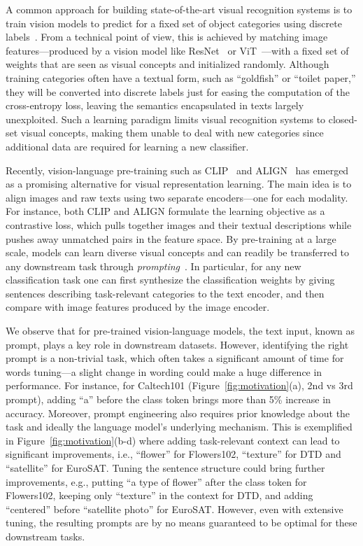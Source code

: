 A common approach for building state-of-the-art visual recognition systems is to train vision models to predict for a fixed set of object categories using discrete labels~\citep{he2016deep,dosovitskiy2021image}. From a technical point of view, this is achieved by matching image features---produced by a vision model like ResNet~\citep{he2016deep} or ViT~\citep{dosovitskiy2021image}---with a fixed set of weights that are seen as visual concepts and initialized randomly. Although training categories often have a textual form, such as ``goldfish'' or ``toilet paper,'' they will be converted into discrete labels just for easing the computation of the cross-entropy loss, leaving the semantics encapsulated in texts largely unexploited. Such a learning paradigm limits visual recognition systems to closed-set visual concepts, making them unable to deal with new categories since additional data are required for learning a new classifier.

Recently, vision-language pre-training such as CLIP~\citep{radford2021learning} and ALIGN~\citep{jia2021scaling} has emerged as a promising alternative for visual representation learning. The main idea is to align images and raw texts using two separate encoders---one for each modality. For instance, both CLIP and ALIGN formulate the learning objective as a contrastive loss, which pulls together images and their textual descriptions while pushes away unmatched pairs in the feature space. By pre-training at a large scale, models can learn diverse visual concepts and can readily be transferred to any downstream task through \emph{prompting}~\citep{radford2021learning,jia2021scaling,furst2021cloob,li2021supervision,singh2021flava,yuan2021florence}. In particular, for any new classification task one can first synthesize the classification weights by giving sentences describing task-relevant categories to the text encoder, and then compare with image features produced by the image encoder.

We observe that for pre-trained vision-language models, the text input, known as prompt, plays a key role in downstream datasets. However, identifying the right prompt is a non-trivial task, which often takes a significant amount of time for words tuning---a slight change in wording could make a huge difference in performance. For instance, for Caltech101 (Figure~\ref{fig:motivation}(a), 2nd vs 3rd prompt), adding ``a'' before the class token brings more than 5\% increase in accuracy. Moreover, prompt engineering also requires prior knowledge about the task and ideally the language model's underlying mechanism. This is exemplified in Figure~\ref{fig:motivation}(b-d) where adding task-relevant context can lead to significant improvements, i.e., ``flower'' for Flowers102, ``texture'' for DTD and ``satellite'' for EuroSAT. Tuning the sentence structure could bring further improvements, e.g., putting ``a type of flower'' after the class token for Flowers102, keeping only ``texture'' in the context for DTD, and adding ``centered'' before ``satellite photo'' for EuroSAT. However, even with extensive tuning, the resulting prompts are by no means guaranteed to be optimal for these downstream tasks.

